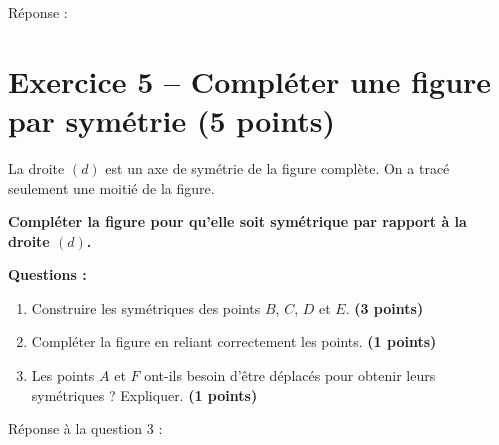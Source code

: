 \documentclass[11pt,a4paper]{article}
\newcommand{\points}[1]{\hfill \textbf{(#1 points)}}
\begin{document}
Réponse :

\dotfill

\dotfill

\dotfill
\section*{Exercice 5 -- Compléter une figure par symétrie \points{5}}

La droite $(d)$ est un axe de symétrie de la figure complète.  
On a tracé seulement une moitié de la figure.

\medskip

\textbf{Compléter la figure pour qu'elle soit symétrique par rapport à la droite $(d)$.}

\begin{center}
\end{center}

\textbf{Questions :}

\begin{enumerate}[label=\arabic*)]
    \item Construire les symétriques des points $B$, $C$, $D$ et $E$. \points{3}
    \item Compléter la figure en reliant correctement les points. \points{1}
    \item Les points $A$ et $F$ ont-ils besoin d'être déplacés pour obtenir leurs symétriques ? Expliquer. \points{1}
\end{enumerate}

\vspace{0.8cm}

Réponse à la question 3 :

\dotfill
\end{document}
